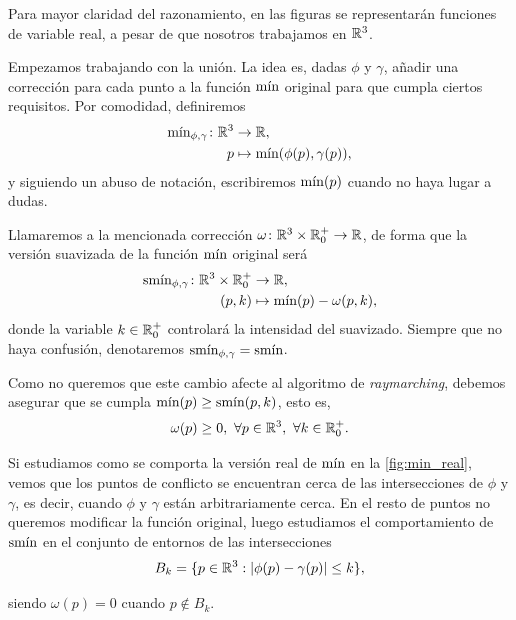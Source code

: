 \begin{observacion}
    Para mayor claridad del razonamiento, en las figuras se representarán funciones de variable real, a pesar de que nosotros trabajamos en $\R^3$.
\end{observacion}

Empezamos trabajando con la unión. La idea es, dadas $\phi$ y $\gamma$, añadir una corrección para cada punto a la función $\Min$ original para que cumpla ciertos requisitos. Por comodidad, definiremos 
\begin{align*}
      \Min_{\phi,\gamma}\colon \R^3 &\to \R,\\
      p &\mapsto \Min(\phi(p),\gamma(p)),
\end{align*}
y siguiendo un abuso de notación, escribiremos $\Min(p)$ cuando no haya lugar a dudas.\newline

Llamaremos a la mencionada corrección $\omega\colon \R^3\times \R^+_0\to\R$, de forma que la versión suavizada de la función $\Min$ original será
\begin{align*}
      \smin_{\phi,\gamma}\colon \R^3\times \R^+_0 &\to \R,\\
      (p,k) &\mapsto \Min(p) - \omega(p,k),
\end{align*}
donde la variable $k\in\R^+_0$ controlará la intensidad del suavizado. Siempre que no haya confusión, denotaremos $\smin_{\phi,\gamma} = \smin$.\newline

Como no queremos que este cambio afecte al algoritmo de \textit{raymarching}, debemos asegurar que se cumpla $\Min(p)\ge \smin(p,k)$, esto es,
\begin{equation*}
\omega(p)\ge 0,\ \forall p\in \R^3,\ \forall k\in \R^+_0.
\end{equation*}

Si estudiamos como se comporta la versión real de $\Min$ en la \autoref{fig:min_real}, vemos que los puntos de conflicto se encuentran cerca de las intersecciones de $\phi$ y $\gamma$, es decir, cuando $\phi$ y $\gamma$ están arbitrariamente cerca. En el resto de puntos no queremos modificar la función original, luego estudiamos el comportamiento de $\smin$ en el conjunto de entornos de las intersecciones
\begin{equation*}
    B_{k} = \{p\in\R^3 : |\phi(p)-\gamma(p)| \le k\},
\end{equation*}

siendo $\omega(p) = 0$ cuando $p\notin B_{k}$.\newline

